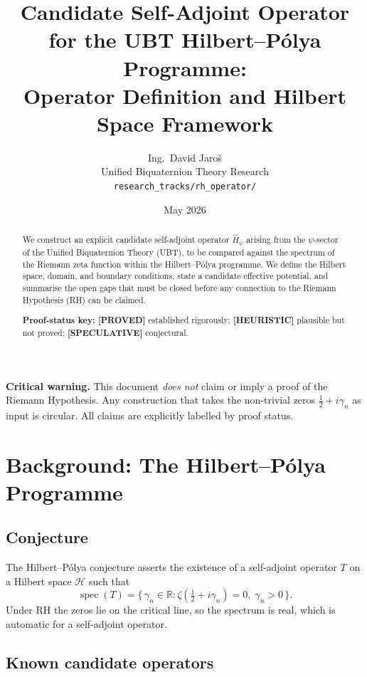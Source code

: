 \documentclass[11pt,a4paper]{article}
\title{Candidate Self-Adjoint Operator for the UBT Hilbert--P\'olya Programme:\\
Operator Definition and Hilbert Space Framework}
\author{Ing.\ David Jaro\v{s}\\
\small Unified Biquaternion Theory Research\\
\small \texttt{research\_tracks/rh\_operator/}}
\date{May 2026}
\newcommand{\proved}[1]{\textbf{[PROVED]} #1}
\newcommand{\heuristic}[1]{\textbf{[HEURISTIC]} #1}
\newcommand{\speculative}[1]{\textbf{[SPECULATIVE]} #1}
\begin{document}
\maketitle

\begin{abstract}
We construct an explicit candidate self-adjoint operator $\hat{H}_\psi$ arising
from the $\psi$-sector of the Unified Biquaternion Theory (UBT), to be compared
against the spectrum of the Riemann zeta function within the Hilbert--P\'olya
programme.  We define the Hilbert space, domain, and boundary conditions,
state a candidate effective potential, and summarise the open gaps that must be
closed before any connection to the Riemann Hypothesis (RH) can be claimed.

\medskip
\noindent\textbf{Proof-status key:} \proved{} established rigorously;
\heuristic{} plausible but not proved; \speculative{} conjectural.
\end{abstract}

\tableofcontents

\bigskip
\noindent\textbf{Critical warning.}  This document \emph{does not} claim or
imply a proof of the Riemann Hypothesis.  Any construction that takes the
non-trivial zeros $\tfrac12+i\gamma_n$ as input is circular.  All claims are
explicitly labelled by proof status.

\section{Background: The Hilbert--P\'olya Programme}

\subsection{Conjecture}

The Hilbert--P\'olya conjecture asserts the existence of a self-adjoint operator
$T$ on a Hilbert space $\mathscr{H}$ such that
\[
  \operatorname{spec}(T) = \bigl\{\,\gamma_n \in \mathbb{R} :
  \zeta(\tfrac12 + i\gamma_n) = 0,\; \gamma_n > 0\,\bigr\}.
\]
Under RH the zeros lie on the critical line, so the spectrum is real, which is
automatic for a self-adjoint operator.

\subsection{Known candidate operators}
\end{document}
